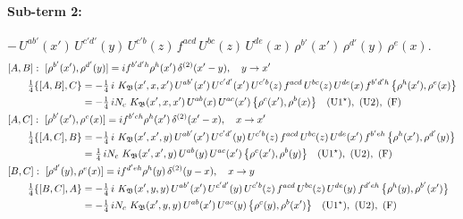 \documentclass[10pt]{article}
\numberwithin{equation}{section}
\begin{document}
\paragraph{Sub-term 2:} $-\,U^{ab'}(x')\,U^{c'd'}(y)\,U^{c'b}(z)\,f^{acd}\,U^{bc}(z)\,U^{de}(x)\,\rho^{b'}(x')\,\rho^{d'}(y)\,\rho^{e}(x)$.
\begin{align}
&[A,B]:\ [\rho^{b'}(x'),\rho^{d'}(y)]=i f^{b'd'h}\rho^{h}(x')\,\delta^{(2)}(x'-y),\quad y\to x'\notag\\
&\qquad \tfrac14\{[A,B],C\}=-\tfrac14\,i\,\,K_{\mathfrak B}(x',x,x')\,U^{ab'}(x')\,U^{c'd'}(x')\,U^{c'b}(z)\,f^{acd}\,U^{bc}(z)\,U^{de}(x)\,f^{b'd'h}\,\big\{\rho^{h}(x'),\rho^{e}(x)\big\}\notag\\
&\qquad\phantom{\tfrac14\{[A,B],C\}}=-\tfrac14\,i N_{c}\,\,K_{\mathfrak B}(x',x,x')\,U^{ab}(x)\,U^{ac}(x')\,\big\{\rho^{c}(x'),\rho^{b}(x)\big\}\quad\text{(U1$^\star$)},\ \text{(U2)},\ \text{(F)}
\label{eq:GIII.I-2-AB}\\
&[A,C]:\ [\rho^{b'}(x'),\rho^{e}(x)]=i f^{b'eh}\rho^{h}(x')\,\delta^{(2)}(x'-x),\quad x\to x'\notag\\
&\qquad \tfrac14\{[A,C],B\}=-\tfrac14\,i\,\,K_{\mathfrak B}(x',x',y)\,U^{ab'}(x')\,U^{c'd'}(y)\,U^{c'b}(z)\,f^{acd}\,U^{bc}(z)\,U^{de}(x')\,f^{b'eh}\,\big\{\rho^{h}(x'),\rho^{d'}(y)\big\}\notag\\
&\qquad\phantom{\tfrac14\{[A,C],B\}}=\tfrac14\,i N_{c}\,\,K_{\mathfrak B}(x',x',y)\,U^{ab}(y)\,U^{ac}(x')\,\big\{\rho^{c}(x'),\rho^{b}(y)\big\}\quad\text{(U1$^\star$)},\ \text{(U2)},\ \text{(F)}
\label{eq:GIII.I-2-AC}\\
&[B,C]:\ [\rho^{d'}(y),\rho^{e}(x)]=i f^{d'eh}\rho^{h}(y)\,\delta^{(2)}(y-x),\quad x\to y\notag\\
&\qquad \tfrac14\{[B,C],A\}=-\tfrac14\,i\,\,K_{\mathfrak B}(x',y,y)\,U^{ab'}(x')\,U^{c'd'}(y)\,U^{c'b}(z)\,f^{acd}\,U^{bc}(z)\,U^{de}(y)\,f^{d'eh}\,\big\{\rho^{h}(y),\rho^{b'}(x')\big\}\notag\\
&\qquad\phantom{\tfrac14\{[B,C],A\}}=-\tfrac14\,i N_{c}\,\,K_{\mathfrak B}(x',y,y)\,U^{ab}(x')\,U^{ac}(y)\,\big\{\rho^{c}(y),\rho^{b}(x')\big\}\quad\text{(U1$^\star$)},\ \text{(U2)},\ \text{(F)}
\label{eq:GIII.I-2-BC}
\end{align}
\end{document}
